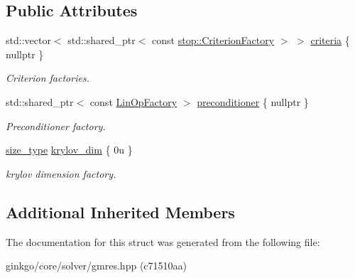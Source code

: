 \subsection*{Public Attributes}
\begin{DoxyCompactItemize}
\item 
\mbox{\label{structgko_1_1solver_1_1Gmres_1_1parameters__type_a7e00d428588b7bcac078083cb03c56c2}} 
std\+::vector$<$ std\+::shared\+\_\+ptr$<$ const \hyperlink{group__stop_gab12a51109c50b35ec36dc5a393d6a9a0}{stop\+::\+Criterion\+Factory} $>$ $>$ \hyperlink{structgko_1_1solver_1_1Gmres_1_1parameters__type_a7e00d428588b7bcac078083cb03c56c2}{criteria} \{ nullptr \}
\begin{DoxyCompactList}\small\item\em Criterion factories. \end{DoxyCompactList}\item 
\mbox{\label{structgko_1_1solver_1_1Gmres_1_1parameters__type_ae20afde8c9429953030e86efd37b0953}} 
std\+::shared\+\_\+ptr$<$ const \hyperlink{classgko_1_1LinOpFactory}{Lin\+Op\+Factory} $>$ \hyperlink{structgko_1_1solver_1_1Gmres_1_1parameters__type_ae20afde8c9429953030e86efd37b0953}{preconditioner} \{ nullptr \}
\begin{DoxyCompactList}\small\item\em Preconditioner factory. \end{DoxyCompactList}\item 
\mbox{\label{structgko_1_1solver_1_1Gmres_1_1parameters__type_a5b88f3758ea7c21c535041289e1b09ce}} 
\hyperlink{namespacegko_a6e5c95df0ae4e47aab2f604a22d98ee7}{size\+\_\+type} \hyperlink{structgko_1_1solver_1_1Gmres_1_1parameters__type_a5b88f3758ea7c21c535041289e1b09ce}{krylov\+\_\+dim} \{ 0u \}
\begin{DoxyCompactList}\small\item\em krylov dimension factory. \end{DoxyCompactList}\end{DoxyCompactItemize}
\subsection*{Additional Inherited Members}


The documentation for this struct was generated from the following file\+:\begin{DoxyCompactItemize}
\item 
ginkgo/core/solver/gmres.\+hpp (c71510aa)\end{DoxyCompactItemize}
